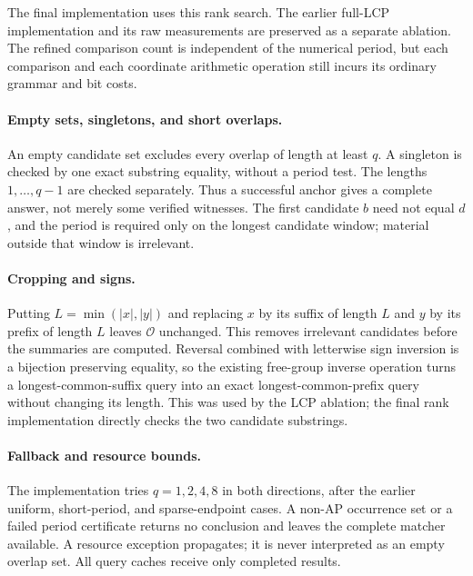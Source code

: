 The final implementation uses this rank search.  The earlier full-LCP
implementation and its raw measurements are preserved as a separate ablation.
The refined comparison count is independent of the numerical period, but
each comparison and each coordinate arithmetic operation still incurs its
ordinary grammar and bit costs.

\paragraph{Empty sets, singletons, and short overlaps.}
An empty candidate set excludes every overlap of length at least $q$.
A singleton is checked by one exact substring equality, without a period
test.  The lengths $1,\ldots,q-1$ are checked separately.  Thus a successful
anchor gives a complete answer, not merely some verified witnesses.
The first candidate $b$ need not equal $d$, and the period is required only
on the longest candidate window; material outside that window is irrelevant.

\paragraph{Cropping and signs.}
Putting $L=\min(|x|,|y|)$ and replacing $x$ by its suffix of length $L$ and
$y$ by its prefix of length $L$ leaves $\mathcal O$ unchanged.  This removes
irrelevant candidates before the summaries are computed.  Reversal combined
with letterwise sign inversion is a bijection preserving equality, so the
existing free-group inverse operation turns a longest-common-suffix query
into an exact longest-common-prefix query without changing its length.
This was used by the LCP ablation; the final rank implementation directly
checks the two candidate substrings.

\paragraph{Fallback and resource bounds.}
The implementation tries $q=1,2,4,8$ in both directions, after the earlier
uniform, short-period, and sparse-endpoint cases.  A non-AP occurrence set
or a failed period certificate returns no conclusion and leaves the complete
matcher available.  A resource exception propagates; it is never interpreted
as an empty overlap set.  All query caches receive only completed results.

